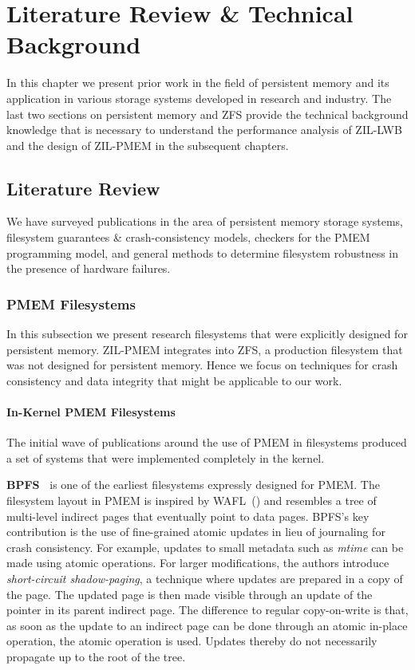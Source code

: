\documentclass[12pt,a4paper,twoside]{book}
\begin{document}
\chapter{Literature Review \& Technical Background}\label{ch:litreviewandbackground}
In this chapter we present prior work in the field of persistent memory and its application in various storage systems developed in research and industry.
The last two sections on persistent memory and ZFS provide the technical background knowledge that is necessary to understand the performance analysis of ZIL-LWB and the design of ZIL-PMEM in the subsequent chapters.

\section{Literature Review}
We have surveyed publications in the area of persistent memory storage systems, filesystem guarantees \& crash-consistency models, checkers for the PMEM programming model, and general methods to determine filesystem robustness in the presence of hardware failures.

\subsection{PMEM Filesystems}
In this subsection we present research filesystems that were explicitly designed for persistent memory.
ZIL-PMEM integrates into ZFS, a production filesystem that was not designed for persistent memory.
Hence we focus on techniques for crash consistency and data integrity that might be applicable to our work.

\subsubsection{In-Kernel PMEM Filesystems}\label{sec:in_kernel_pmem_filesystems}
The initial wave of publications around the use of PMEM in filesystems produced a set of systems that were implemented completely in the kernel.

\newcommand{\citerelwork}[2]{\textbf{#1~\cite{#2}}}

\citerelwork{BPFS}{conditBetterByteaddressablePersistent2009} is one of the earliest filesystems expressly designed for PMEM.
The filesystem layout in PMEM is inspired by WAFL~(\cite{hitzFileSystemDesign1994}) and resembles a tree of multi-level indirect pages that eventually point to data pages.
BPFS’s key contribution is the use of fine-grained atomic updates in lieu of journaling for crash consistency.
For example, updates to small metadata such as \textit{mtime} can be made using atomic operations.
For larger modifications, the authors introduce \textit{short-circuit shadow-paging}, a technique where updates are prepared in a copy of the page.
The updated page is then made visible through an update of the pointer in its parent indirect page.
The difference to regular copy-on-write is that, as soon as the update to an indirect page can be done through an atomic in-place operation, the atomic operation is used.
Updates thereby do not necessarily propagate up to the root of the tree.
\end{document}
